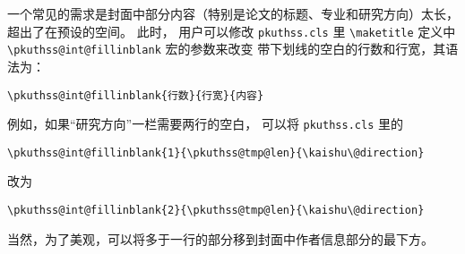 	一个常见的需求是封面中部分内容（特别是论文的标题、专业和研究方向）太长，
	超出了在预设的空间。
	此时，
	用户可以修改 \verb|pkuthss.cls| 里 \verb|\maketitle| 定义中
	\verb|\pkuthss@int@fillinblank| 宏的参数来改变
	带下划线的空白的行数和行宽，其语法为：
\begin{Verbatim}[frame = single]
\pkuthss@int@fillinblank{行数}{行宽}{内容}
\end{Verbatim}
	例如，如果“研究方向”一栏需要两行的空白，
	可以将 \verb|pkuthss.cls| 里的
\begin{Verbatim}[frame = single]
\pkuthss@int@fillinblank{1}{\pkuthss@tmp@len}{\kaishu\@direction}
\end{Verbatim}
	改为
\begin{Verbatim}[frame = single]
\pkuthss@int@fillinblank{2}{\pkuthss@tmp@len}{\kaishu\@direction}
\end{Verbatim}
	当然，为了美观，可以将多于一行的部分移到封面中作者信息部分的最下方。

